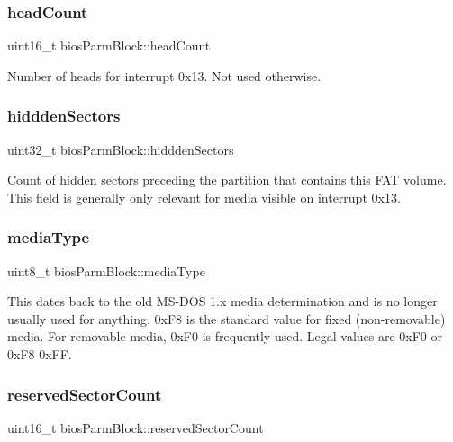 \subsubsection{\texorpdfstring{head\+Count}{headCount}}
{\footnotesize\ttfamily uint16\+\_\+t bios\+Parm\+Block\+::head\+Count}

Number of heads for interrupt 0x13. Not used otherwise. \mbox{\label{structbios_parm_block_a9413199be8525190d40589f60c22bcab}} 
\subsubsection{\texorpdfstring{hiddden\+Sectors}{hidddenSectors}}
{\footnotesize\ttfamily uint32\+\_\+t bios\+Parm\+Block\+::hiddden\+Sectors}

Count of hidden sectors preceding the partition that contains this F\+AT volume. This field is generally only relevant for media visible on interrupt 0x13. \mbox{\label{structbios_parm_block_a4237e7c3ba247516d546c149954e5042}} 
\subsubsection{\texorpdfstring{media\+Type}{mediaType}}
{\footnotesize\ttfamily uint8\+\_\+t bios\+Parm\+Block\+::media\+Type}

This dates back to the old M\+S-\/\+D\+OS 1.\+x media determination and is no longer usually used for anything. 0x\+F8 is the standard value for fixed (non-\/removable) media. For removable media, 0x\+F0 is frequently used. Legal values are 0x\+F0 or 0x\+F8-\/0x\+FF. \mbox{\label{structbios_parm_block_adb4830c345b27293c7d7b97b77f52e01}} 
\subsubsection{\texorpdfstring{reserved\+Sector\+Count}{reservedSectorCount}}
{\footnotesize\ttfamily uint16\+\_\+t bios\+Parm\+Block\+::reserved\+Sector\+Count}

